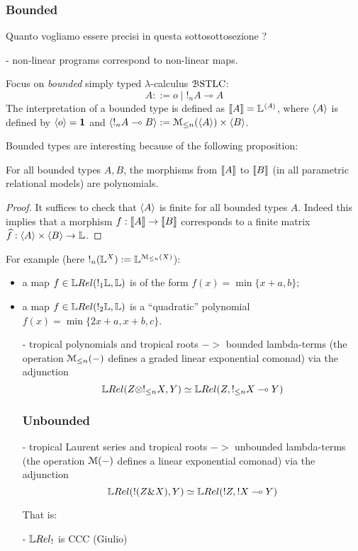 \subsubsection{Bounded}

Quanto vogliamo essere precisi in questa sottosottosezione ?

- non-linear programs correspond to non-linear maps.

Focus on \emph{bounded} simply typed $\lambda$-calculus $\mathcal{B}\mathrm{STLC}$:
$$
A::= o \mid !_{n}A \multimap A
$$
The interpretation of a bounded type is defined as 
$\llbracket A\rrbracket= \mathbb{L}^{\langle A\rangle}$, where 
$\langle A\rangle$ is defined by $\langle o\rangle=\mathbf{1}$ and 
$\langle !_{n}A\multimap B\rangle:= \mathcal{M}_{\leq n}(\langle A\rangle) \times \langle B\rangle$.

Bounded types are interesting
because of the following proposition:
\begin{proposition}
For all bounded types $A,B$, the morphisms from $\llbracket A\rrbracket$ to $\llbracket B\rrbracket$ (in all parametric relational models) are polynomials.


\end{proposition}
\begin{proof}
It suffices to check that $\langle A\rangle$ is finite for all bounded types $A$. Indeed this implies that a morphism $f:\llbracket A\rrbracket\to \llbracket B\rrbracket$ corresponds to a finite matrix $\widehat f: \langle A\rangle \times \langle B\rangle \to \mathbb{L}$.
\end{proof}

For example (here $!_{n}(\mathbb{L}^{X}):= \mathbb{L}^{\mathcal{M}_{\leq n}(X)}$):
\begin{itemize}
\item a map $f\in \LREL( !_{1}\Lawv, \Lawv)$ is of the form $f(x)=\min \{x+a,b\}$;

\item a map $f\in \LREL(!_{2}\Lawv, \Lawv)$ is a ``quadratic'' polynomial $f(x)=\min\{2x+a, x+b, c\}$.

- tropical polynomials and tropical roots $->$ bounded lambda-terms
(the operation $\mathcal{M}_{\leq n}(-)$ defines a graded linear exponential comonad) via the adjunction
$$
\LREL(Z\otimes !_{\leq n}X,Y) \simeq \LREL(Z, !_{\leq n}X\multimap Y) 
$$

\subsubsection{Unbounded}

- tropical Laurent series and tropical roots $->$ unbounded lambda-terms (the operation $\mathcal{M}(-)$ defines a linear exponential comonad) via the adjunction
$$
\LREL(!(Z\& X),Y) \simeq \LREL(!Z, !X\multimap Y) 
$$

That is:

- $\LREL_!$ is CCC (Giulio)


\end{itemize}




